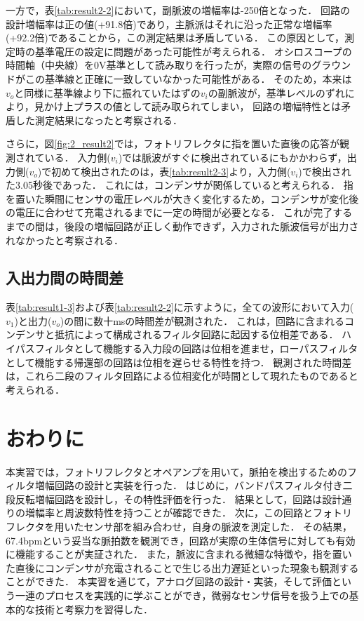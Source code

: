 一方で，表\ref{tab:result2-2}において，副脈波の増幅率は-250倍となった．
回路の設計増幅率は正の値(+91.8倍)であり，主脈派はそれに沿った正常な増幅率(+92.2倍)であることから，この測定結果は矛盾している．
この原因として，測定時の基準電圧の設定に問題があった可能性が考えられる．
オシロスコープの時間軸（中央線）を0V基準として読み取りを行ったが，実際の信号のグラウンドがこの基準線と正確に一致していなかった可能性がある．
そのため，本来は$v_o$と同様に基準線より下に振れていたはずの$v_i$の副脈波が，基準レベルのずれにより，見かけ上プラスの値として読み取られてしまい，
回路の増幅特性とは矛盾した測定結果になったと考察される．

\newpage

さらに，図\ref{fig:2_result2}では，フォトリフレクタに指を置いた直後の応答が観測されている．
入力側($v_i$)では脈波がすぐに検出されているにもかかわらず，出力側($v_o$)で初めて検出されたのは，表\ref{tab:result2-3}より，入力側($v_i$)で検出された3.05秒後であった．
これには，コンデンサが関係していると考えられる．
指を置いた瞬間にセンサの電圧レベルが大きく変化するため，コンデンサが変化後の電圧に合わせて充電されるまでに一定の時間が必要となる．
これが完了するまでの間は，後段の増幅回路が正しく動作できず，入力された脈波信号が出力されなかったと考察される．



\subsection{入出力間の時間差}
表\ref{tab:result1-3}および表\ref{tab:result2-2}に示すように，全ての波形において入力($v_1$)と出力($v_o$)の間に数十msの時間差が観測された．
これは，回路に含まれるコンデンサと抵抗によって構成されるフィルタ回路に起因する位相差である．
ハイパスフィルタとして機能する入力段の回路は位相を進ませ，ローパスフィルタとして機能する帰還部の回路は位相を遅らせる特性を持つ．
観測された時間差は，これら二段のフィルタ回路による位相変化が時間として現れたものであると考えられる．





\section{おわりに} 
本実習では，フォトリフレクタとオペアンプを用いて，脈拍を検出するためのフィルタ増幅回路の設計と実装を行った．
はじめに，バンドパスフィルタ付き二段反転増幅回路を設計し，その特性評価を行った．
結果として，回路は設計通りの増幅率と周波数特性を持つことが確認できた．
次に，この回路とフォトリフレクタを用いたセンサ部を組み合わせ，自身の脈波を測定した．
その結果，67.4bpmという妥当な脈拍数を観測でき，回路が実際の生体信号に対しても有効に機能することが実証された．
また，脈波に含まれる微細な特徴や，指を置いた直後にコンデンサが充電されることで生じる出力遅延といった現象も観測することができた．
本実習を通じて，アナログ回路の設計・実装，そして評価という一連のプロセスを実践的に学ぶことができ，微弱なセンサ信号を扱う上での基本的な技術と考察力を習得した．